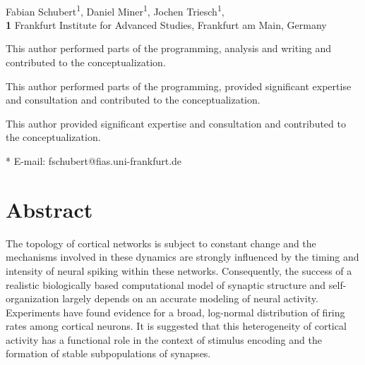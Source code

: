 \documentclass[10pt,letterpaper]{article}
\date{}
\begin{document}
\vspace*{0.2in}

\begin{flushleft}
{\Large
\textbf{} %
}
\newline
\\
Fabian Schubert\textsuperscript{1\Yinyang},
Daniel Miner\textsuperscript{1\ddag},
Jochen Triesch\textsuperscript{1\dag},
\\
\bigskip
\textbf{1} Frankfurt Institute for Advanced Studies, Frankfurt am Main, Germany
\\
\bigskip

% 
%
\Yinyang This author performed parts of the programming, analysis and writing and contributed to the conceptualization.

\ddag This author performed parts of the programming, provided significant expertise and consultation and contributed to the conceptualization.

\dag This author provided significant expertise and consultation and contributed to the conceptualization.

* E-mail: fschubert@fias.uni-frankfurt.de

\end{flushleft}
\section*{Abstract}
The topology of cortical networks is subject to constant change and the mechanisms involved in these dynamics are strongly influenced by the timing and intensity of neural spiking within these networks. Consequently, the success of a realistic biologically based computational model of synaptic structure and self-organization largely depends on an accurate modeling of neural activity. Experiments have found evidence for a broad, log-normal distribution of firing rates among cortical neurons.
It is suggested that this heterogeneity of cortical activity has a functional role in the context of stimulus encoding and the formation of stable subpopulations of synapses.
\end{document}
